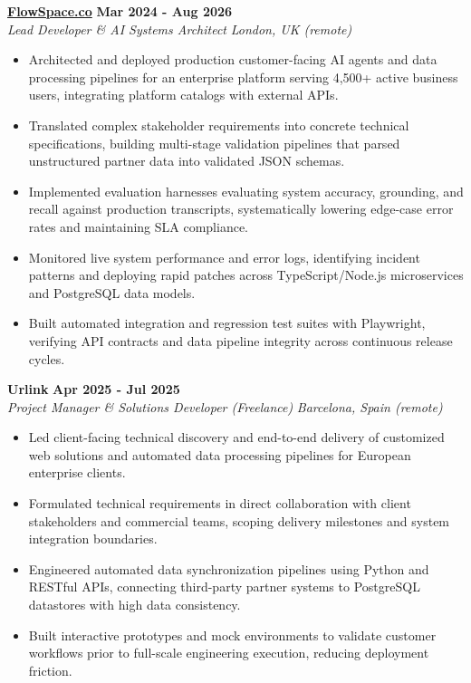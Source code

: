 \documentclass[10pt,a4paper]{article}
\newcommand{\role}[4]{%
  \textbf{#1} \hfill \textbf{#2}\\[1pt]%
  \textit{#3} \hfill \textit{#4}\\[2pt]%
}
\begin{document}
\role{\href{https://flowspace.co}{FlowSpace.co}}{Mar 2024 - Aug 2026}{Lead Developer \& AI Systems Architect}{London, UK (remote)}
\begin{itemize}
  \item Architected and deployed production customer-facing AI agents and data processing pipelines for an enterprise platform serving 4,500+ active business users, integrating platform catalogs with external APIs.
  \item Translated complex stakeholder requirements into concrete technical specifications, building multi-stage validation pipelines that parsed unstructured partner data into validated JSON schemas.
  \item Implemented evaluation harnesses evaluating system accuracy, grounding, and recall against production transcripts, systematically lowering edge-case error rates and maintaining SLA compliance.
  \item Monitored live system performance and error logs, identifying incident patterns and deploying rapid patches across TypeScript/Node.js microservices and PostgreSQL data models.
  \item Built automated integration and regression test suites with Playwright, verifying API contracts and data pipeline integrity across continuous release cycles.
\end{itemize}

\role{Urlink}{Apr 2025 - Jul 2025}{Project Manager \& Solutions Developer (Freelance)}{Barcelona, Spain (remote)}
\begin{itemize}
  \item Led client-facing technical discovery and end-to-end delivery of customized web solutions and automated data processing pipelines for European enterprise clients.
  \item Formulated technical requirements in direct collaboration with client stakeholders and commercial teams, scoping delivery milestones and system integration boundaries.
  \item Engineered automated data synchronization pipelines using Python and RESTful APIs, connecting third-party partner systems to PostgreSQL datastores with high data consistency.
  \item Built interactive prototypes and mock environments to validate customer workflows prior to full-scale engineering execution, reducing deployment friction.
\end{itemize}
\end{document}
